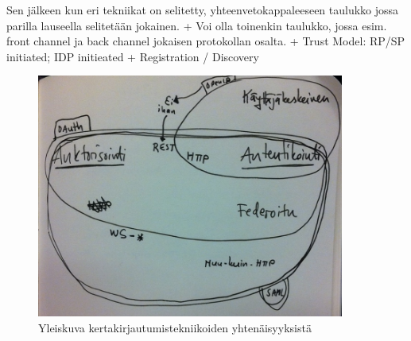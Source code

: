 \documentclass[finnish,gradu]{tktltiki}
\begin{document}
  Sen jälkeen kun eri tekniikat on selitetty, yhteenvetokappaleeseen taulukko jossa parilla lauseella selitetään jokainen.
  + Voi olla toinenkin taulukko, jossa esim. front channel ja back channel jokaisen protokollan osalta.
  + Trust Model: RP/SP initiated; IDP initieated %
  + Registration / Discovery %

    \begin{figure}
      \centering
      \includegraphics[width=0.9\textwidth]{images/kertakirkautumistekniikat_venn.jpg}
      \caption{Yleiskuva kertakirjautumistekniikoiden yhtenäisyyksistä}
      \label{fig:yleiskuva}
    \end{figure}
\end{document}
